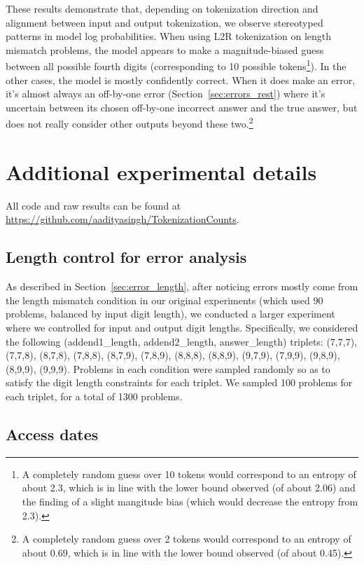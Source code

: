 \documentclass{article}
\theoremstyle{plain}
\theoremstyle{definition}
\theoremstyle{remark}
\begin{document}
These results demonstrate that, depending on tokenization direction and alignment between input and output tokenization, we observe stereotyped patterns in model log probabilities. When using L2R tokenization on length mismatch problems, the model appears to make a magnitude-biased guess between all possible fourth digits (corresponding to 10 possible tokens\footnote{A completely random guess over 10 tokens would correspond to an entropy of about 2.3, which is in line with the lower bound observed (of about 2.06) and the finding of a slight mangitude bias (which would decrease the entropy from 2.3).}). In the other cases, the model is mostly confidently correct. When it does make an error, it's almost always an off-by-one error (Section~\ref{sec:errors_rest}) where it's uncertain between its chosen off-by-one incorrect answer and the true answer, but does not really consider other outputs beyond these two.\footnote{A completely random guess over 2 tokens would correspond to an entropy of about 0.69, which is in line with the lower bound observed (of about 0.45).}

\section{Additional experimental details}
\label{appx:extra_details}

All code and raw results can be found at \url{https://github.com/aadityasingh/TokenizationCounts}.

\subsection{Length control for error analysis}
\label{appx:length_control}

As described in Section~\ref{sec:error_length}, after noticing errors mostly come from the length mismatch condition in our original experiments (which used 90 problems, balanced by input digit length), we conducted a larger experiment where we controlled for input and output digit lengths. Specifically, we considered the following (addend1\_length, addend2\_length, answer\_length) triplets: (7,7,7), (7,7,8), (8,7,8), (7,8,8), (8,7,9), (7,8,9), (8,8,8), (8,8,9), (9,7,9), (7,9,9), (9,8,9), (8,9,9), (9,9,9). Problems in each condition were sampled randomly so as to satisfy the digit length constraints for each triplet. We sampled 100 problems for each triplet, for a total of 1300 problems.

\subsection{Access dates}
\label{appx:access}
\end{document}
